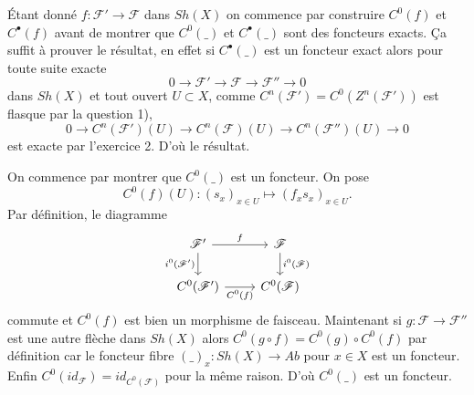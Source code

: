 \documentclass[a4paper,12pt]{article}
\newcommand{\F}{\mathscr F}
\theoremstyle{plain}
\theoremstyle{definition}
\theoremstyle{remark}
\begin{document}
Étant donné $f\colon \F'\to \F$ dans $Sh(X)$ on commence par construire 
$C^0(f)$ et $C^\bullet(f)$ avant de montrer que $C^0(\_)$ et 
$C^\bullet(\_)$ sont des foncteurs exacts. Ça suffit à prouver le 
résultat, en effet si $C^\bullet(\_)$ est un foncteur exact alors pour
toute suite exacte \[0\to \F'\to \F\to \F''\to 0\]
dans $Sh(X)$ et tout ouvert $U\subset X$,
comme $C^n(\F')=C^0(Z^n(\F'))$ est flasque par la question 1),
\[0\to C^n(\F')(U)\to C^n(\F)(U)\to C^n(\F'')(U)\to 0\] est exacte
par l'exercice 2. D'où le résultat.

On commence par montrer que $C^0(\_)$ est un foncteur. On pose
\[C^0(f)(U)\colon (s_x)_{x\in U}\mapsto (f_x s_x)_{x\in U}.\]
Par définition, le diagramme
\[\begin{tikzcd}
	{\F'} & \F \\
	{C^0(\F')} & {C^0(\F)}
	\arrow["f", from=1-1, to=1-2]
	\arrow["{i^0(\F')}"', from=1-1, to=2-1]
	\arrow["{i^0(\F)}", from=1-2, to=2-2]
	\arrow["{C^0(f)}"', from=2-1, to=2-2]
\end{tikzcd}\]
commute et $C^0(f)$ est bien un morphisme de faisceau. Maintenant 
si $g\colon \F\to \F''$ est une autre flèche dans $Sh(X)$ alors 
$C^0(g\circ f)=C^0(g)\circ C^0(f)$ par définition car le foncteur
fibre $(\_)_x \colon Sh(X)\to Ab$ pour $x\in X$ est un foncteur. Enfin
$C^0(id_\F)=id_{C^0(\F)}$ pour la même raison. D'où
$C^0(\_)$ est un foncteur.
\newline
\end{document}
